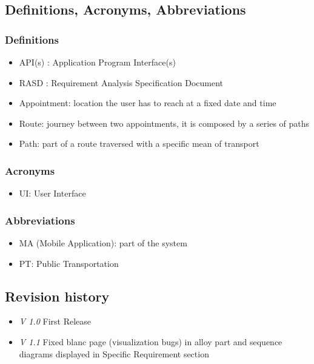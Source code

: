 \subsection{Definitions, Acronyms, Abbreviations}

\subsubsection{Definitions}
\begin{itemize}
	\item API(s) : Application Program Interface(s)
	\item RASD : Requirement Analysis Specification Document
	\item Appointment: location the user has to reach at a fixed date and time
	\item Route: journey between two appointments, it is composed by a series of paths
	\item Path: part of a route traversed with a specific mean of transport
\end{itemize}


\subsubsection{Acronyms}
\begin{itemize}
	\item UI: User Interface
\end{itemize}

\subsubsection{Abbreviations}
\begin{itemize}
	\item MA (Mobile Application): part of the system
	\item PT: Public Transportation
\end{itemize}

\subsection{Revision history}

\begin{itemize}
	\item \emph{V 1.0} First Release
	\item \emph{V 1.1} Fixed blanc page (visualization bugs) in alloy part and sequence diagrams displayed in Specific Requirement section
\end{itemize}



